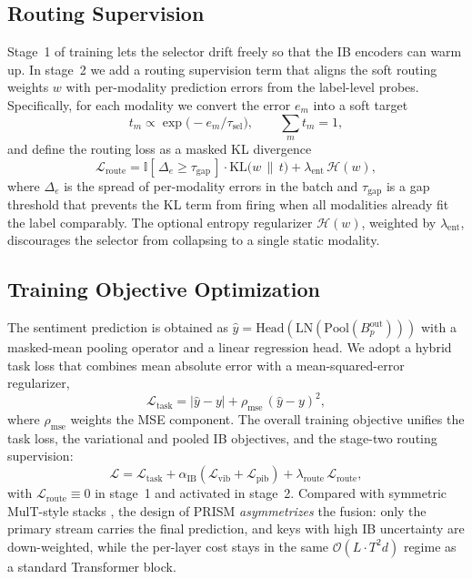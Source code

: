 \subsection{Routing Supervision}
\label{sec:method-rib}
Stage~1 of training lets the selector drift freely so that the IB encoders can
warm up. In stage~2 we add a routing supervision term that aligns the soft
routing weights $w$ with per-modality prediction errors from the label-level
probes. Specifically, for each modality we convert the error $e_m$ into a
soft target
\begin{equation}
  t_m \propto \exp\!\bigl(-e_m / \tau_{\mathrm{sel}}\bigr),
  \qquad
  \sum_{m} t_m = 1,
\end{equation}
and define the routing loss as a masked KL divergence
\begin{equation}
  \mathcal{L}_{\mathrm{route}}
    = \mathbb{I}[\,\Delta_e \ge \tau_{\mathrm{gap}}\,]\cdot
      \mathrm{KL}\bigl(w\,\|\,t\bigr)
    + \lambda_{\mathrm{ent}}\,\mathcal{H}(w),
\end{equation}
where $\Delta_e$ is the spread of per-modality errors in the batch and
$\tau_{\mathrm{gap}}$ is a gap threshold that prevents the KL term from
firing when all modalities already fit the label comparably. The optional
entropy regularizer $\mathcal{H}(w)$, weighted by $\lambda_{\mathrm{ent}}$,
discourages the selector from collapsing to a single static modality.

\subsection{Training Objective Optimization}
\label{sec:method-loss}
The sentiment prediction is obtained as
$\hat{y} = \mathrm{Head}(\mathrm{LN}(\mathrm{Pool}(B_p^{\mathrm{out}})))$
with a masked-mean pooling operator and a linear regression head.
We adopt a hybrid task loss that combines mean absolute error with a
mean-squared-error regularizer,
\begin{equation}
  \mathcal{L}_{\mathrm{task}}
    = |\hat{y} - y| + \rho_{\mathrm{mse}}\,(\hat{y} - y)^2,
\end{equation}
where $\rho_{\mathrm{mse}}$ weights the MSE component.
The overall training objective unifies the task loss, the variational and
pooled IB objectives, and the stage-two routing supervision:
\begin{equation}
  \mathcal{L}
    = \mathcal{L}_{\mathrm{task}}
    + \alpha_{\mathrm{IB}}\!\left(\mathcal{L}_{\mathrm{vib}}
        + \mathcal{L}_{\mathrm{pib}}\right)
    + \lambda_{\mathrm{route}}\,\mathcal{L}_{\mathrm{route}},
\end{equation}
with $\mathcal{L}_{\mathrm{route}} \equiv 0$ in stage~1 and activated in
stage~2.
Compared with symmetric MulT-style stacks \citep{tsai2019multimodal}, the
design of PRISM \emph{asymmetrizes} the fusion: only the primary stream
carries the final prediction, and keys with high IB uncertainty are
down-weighted, while the per-layer cost stays in the same
$\mathcal{O}(L \cdot T^2 d)$ regime as a standard Transformer block.
